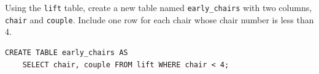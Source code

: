 \begin{blocksection}
\question Using the \lstinline{lift} table, create a new table named \lstinline{early_chairs} with two columns, \lstinline{chair} and \lstinline{couple}. Include one row for each chair whose chair number is less than 4.

\begin{solution}[1.5in]
\begin{lstlisting}
CREATE TABLE early_chairs AS
    SELECT chair, couple FROM lift WHERE chair < 4;
\end{lstlisting}
\end{solution}
\end{blocksection}
